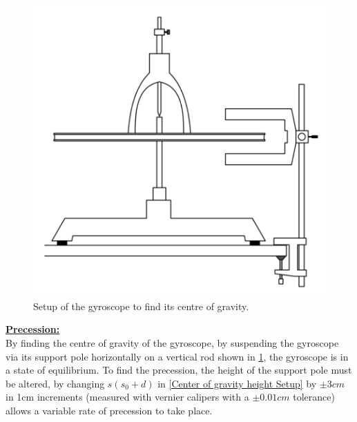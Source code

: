 \documentclass[12pt]{article}
\begin{document}
\begin{multicols}{2}
\begin{figure}[H]
\centering
\includegraphics[scale=0.5]{Images/Labscript/22_Centre_of_Gravity.png}
\caption{Setup of the gyroscope to find its centre of gravity. \cite{Exp.4-2019}}
\label{2.2 Center of Gravity Setup}
\end{figure}
\end{multicols}

\textbf{\underline{Precession:}} \\

By finding the centre of gravity of the gyroscope, by suspending the gyroscope via its support pole horizontally on a vertical rod shown in \cref{2.2 Center of Gravity Setup}, the gyroscope is in a state of equilibrium. To find the precession, the height of the support pole must be altered, by changing $s (s_0+d)$ in \cref{Center of gravity height Setup} by $\pm3cm$ in 1cm increments (measured with vernier calipers with a $\pm0.01cm$ tolerance) allows a variable rate of precession to take place. \\
\end{document}

